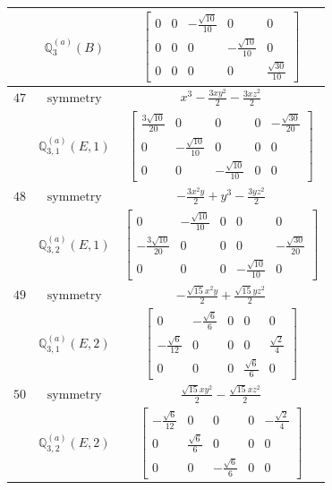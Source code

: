 \documentclass[fleqn,8pt,landscape]{jsarticle}
\begin{document}
\begin{longtable}{ccc}
$  $ & $ \mathbb{Q}_{3}^{(a)}(B) $ & $ \begin{bmatrix} 0 & 0 & - \frac{\sqrt{10}}{10} & 0 & 0 \\ 0 & 0 & 0 & - \frac{\sqrt{10}}{10} & 0 \\ 0 & 0 & 0 & 0 & \frac{\sqrt{30}}{10} \end{bmatrix} $ \\ \hline
$ 47 $ & $ \text{symmetry} $ & $ x^{3} - \frac{3 x y^{2}}{2} - \frac{3 x z^{2}}{2} $ \\
$  $ & $ \mathbb{Q}_{3,1}^{(a)}(E,1) $ & $ \begin{bmatrix} \frac{3 \sqrt{10}}{20} & 0 & 0 & 0 & - \frac{\sqrt{30}}{20} \\ 0 & - \frac{\sqrt{10}}{10} & 0 & 0 & 0 \\ 0 & 0 & - \frac{\sqrt{10}}{10} & 0 & 0 \end{bmatrix} $ \\ \hline
$ 48 $ & $ \text{symmetry} $ & $ - \frac{3 x^{2} y}{2} + y^{3} - \frac{3 y z^{2}}{2} $ \\
$  $ & $ \mathbb{Q}_{3,2}^{(a)}(E,1) $ & $ \begin{bmatrix} 0 & - \frac{\sqrt{10}}{10} & 0 & 0 & 0 \\ - \frac{3 \sqrt{10}}{20} & 0 & 0 & 0 & - \frac{\sqrt{30}}{20} \\ 0 & 0 & 0 & - \frac{\sqrt{10}}{10} & 0 \end{bmatrix} $ \\ \hline
$ 49 $ & $ \text{symmetry} $ & $ - \frac{\sqrt{15} x^{2} y}{2} + \frac{\sqrt{15} y z^{2}}{2} $ \\
$  $ & $ \mathbb{Q}_{3,1}^{(a)}(E,2) $ & $ \begin{bmatrix} 0 & - \frac{\sqrt{6}}{6} & 0 & 0 & 0 \\ - \frac{\sqrt{6}}{12} & 0 & 0 & 0 & \frac{\sqrt{2}}{4} \\ 0 & 0 & 0 & \frac{\sqrt{6}}{6} & 0 \end{bmatrix} $ \\ \hline
$ 50 $ & $ \text{symmetry} $ & $ \frac{\sqrt{15} x y^{2}}{2} - \frac{\sqrt{15} x z^{2}}{2} $ \\
$  $ & $ \mathbb{Q}_{3,2}^{(a)}(E,2) $ & $ \begin{bmatrix} - \frac{\sqrt{6}}{12} & 0 & 0 & 0 & - \frac{\sqrt{2}}{4} \\ 0 & \frac{\sqrt{6}}{6} & 0 & 0 & 0 \\ 0 & 0 & - \frac{\sqrt{6}}{6} & 0 & 0 \end{bmatrix} $ \\ \hline

\end{longtable}
\end{document}
